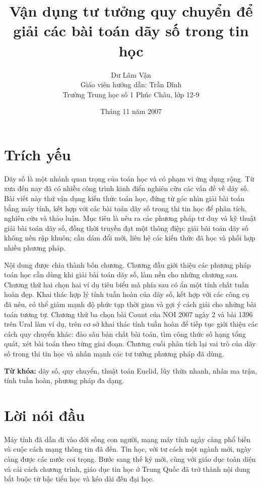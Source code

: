 \documentclass[11pt]{article}
\title{Vận dụng tư tưởng quy chuyển để giải các bài toán dãy số trong tin học}
\author{Dư Lâm Vận\\[0.3em]\small Giáo viên hướng dẫn: Trần Dĩnh\\
\small Trường Trung học số 1 Phúc Châu, lớp 12-9}
\date{Tháng 11 năm 2007}
\begin{document}
\maketitle


\section*{Trích yếu}

Dãy số là một nhánh quan trọng của toán học và có phạm vi ứng dụng rộng. Từ
xưa đến nay đã có nhiều công trình kinh điển nghiên cứu các vấn đề về dãy số.
Bài viết này thử vận dụng kiến thức toán học, đứng từ góc nhìn giải bài toán
bằng máy tính, kết hợp với các bài toán dãy số trong thi tin học để phân tích,
nghiên cứu và thảo luận. Mục tiêu là nêu ra các phương pháp tư duy và kỹ thuật
giải bài toán dãy số, đồng thời truyền đạt một thông điệp: giải bài toán dãy
số không nên rập khuôn; cần dám đổi mới, liên hệ các kiến thức đã học và phối
hợp nhiều phương pháp.

Nội dung được chia thành bốn chương. Chương đầu giới thiệu các phương pháp
toán học cần dùng khi giải bài toán dãy số, làm nền cho những chương sau.
Chương thứ hai chọn hai ví dụ tiêu biểu mà phía sau có ẩn một tính chất tuần
hoàn đẹp. Khai thác hợp lý tính tuần hoàn của dãy số, kết hợp với các công cụ
đã nêu, có thể giảm mạnh độ phức tạp thời gian và gợi ý cách giải cho những
bài toán tương tự. Chương thứ ba chọn bài Count của NOI 2007 ngày 2 và bài
1396 trên Ural làm ví dụ, trên cơ sở khai thác tính tuần hoàn để tiếp tục giới
thiệu các cách quy chuyển khác: đào sâu bản chất bài toán, tìm công thức số
hạng tổng quát, xét bài toán theo từng giai đoạn. Chương cuối phân tích lại
vai trò của dãy số trong thi tin học và nhấn mạnh các tư tưởng phương pháp đã
dùng.

\noindent\textbf{Từ khóa:} dãy số, quy chuyển, thuật toán Euclid, lũy thừa
nhanh, nhân ma trận, tính tuần hoàn, phương pháp đa dạng.

\section*{Lời nói đầu}

Máy tính đã dần đi vào đời sống con người, mạng máy tính ngày càng phổ biến
và cuộc cách mạng thông tin đã đến. Tin học, với tư cách một ngành mới, ngày
càng được các nước coi trọng. Bước sang thế kỷ mới, cùng với giáo dục toàn
diện và cải cách chương trình, giáo dục tin học ở Trung Quốc đã trở thành nội
dung bắt buộc từ bậc tiểu học và kéo dài đến đại học.
\end{document}
